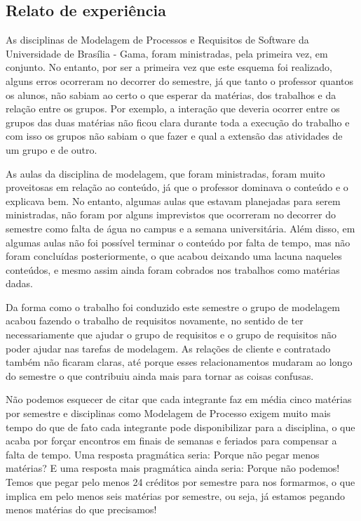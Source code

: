 \subsection{Relato de experiência}
As disciplinas de Modelagem de Processos e Requisitos de Software da Universidade de Brasília - Gama, foram ministradas, pela primeira vez, em conjunto. No entanto, por ser a primeira vez que este esquema foi realizado, alguns erros ocorreram no decorrer do semestre, já que tanto o professor quantos os alunos, não sabiam ao certo o que esperar da matérias, dos trabalhos e da relação entre os grupos. Por exemplo, a interação que deveria ocorrer entre os grupos das duas matérias não ficou clara durante toda a execução do trabalho e com isso os grupos não sabiam o que fazer e qual a extensão das atividades de um grupo e de outro.

As aulas da disciplina de modelagem, que foram ministradas, foram muito proveitosas em relação ao conteúdo, já que o professor dominava o conteúdo e o explicava bem. No entanto, algumas aulas que estavam planejadas para serem ministradas, não foram por alguns imprevistos que ocorreram no decorrer do semestre como falta de água no campus e a semana universitária. Além disso, em algumas aulas não foi possível terminar o conteúdo por falta de tempo, mas não foram concluídas posteriormente, o que acabou deixando uma lacuna naqueles conteúdos, e mesmo assim ainda foram cobrados nos trabalhos como matérias dadas. 

Da forma como o trabalho foi conduzido este semestre o grupo de modelagem acabou fazendo o trabalho de requisitos novamente, no sentido de ter necessariamente que ajudar o grupo de requisitos e o grupo de requisitos não poder ajudar nas tarefas de modelagem. As relações de cliente e contratado também não ficaram claras, até porque esses relacionamentos mudaram ao longo do semestre o que contribuiu ainda mais para tornar as coisas confusas.

Não podemos esquecer de citar que cada integrante faz em média cinco matérias por semestre e disciplinas como Modelagem de Processo exigem muito mais tempo do que de fato cada integrante pode disponibilizar para a disciplina, o que acaba por forçar encontros em finais de semanas e feriados para compensar a falta de tempo. Uma resposta pragmática seria: Porque não pegar menos matérias? E uma resposta mais pragmática ainda seria: Porque não podemos! Temos que pegar pelo menos 24 créditos por semestre para nos formarmos, o que implica em pelo menos seis matérias por semestre, ou seja, já estamos pegando menos matérias do que precisamos!

